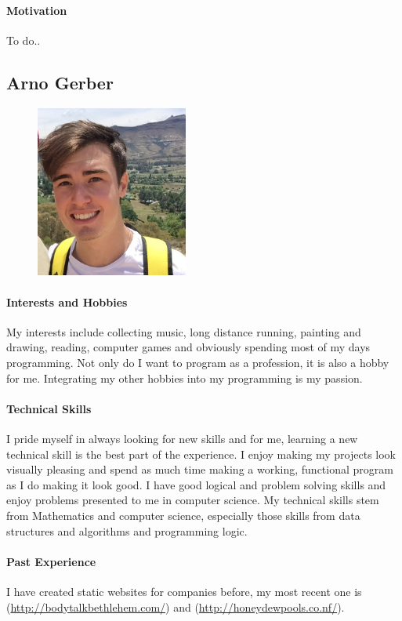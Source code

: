 \documentclass[english]{article}
\begin{document}
		\paragraph{Motivation}
		To do..
		
		\newpage
		\subsection{Arno Gerber}
		\begin{figure}
			\begin{center}
				\includegraphics[width=5cm]{arno.jpg}
			\end{center}
		\end{figure}
		\paragraph{Interests and Hobbies}
		My interests include collecting music, long distance running, painting and drawing, reading, computer games and obviously spending most of my days programming. Not only do I want to program as a profession, it is also a hobby for me. Integrating my other hobbies into my programming is my passion.
		
		\paragraph{Technical Skills}
		I pride myself in always looking for new skills and for me, learning a new technical skill is the best part of the experience. I enjoy making my projects look visually pleasing and spend as much time making a working, functional program as I do making it look good. I have good logical and problem solving skills and enjoy problems presented to me in computer science. My technical skills stem from Mathematics and computer science, especially those skills from data structures and algorithms and programming logic.
		
		\paragraph{Past Experience}
		I have created static websites for companies before, my most recent one is (\href{http://bodytalkbethlehem.com/}{http://bodytalkbethlehem.com/}) and (\href{http://honeydewpools.co.nf/}{http://honeydewpools.co.nf/}).
		
\end{document}
